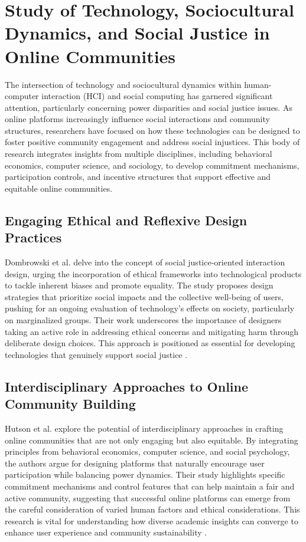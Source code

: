 \section{Study of Technology, Sociocultural Dynamics, and Social Justice in Online Communities}
The intersection of technology and sociocultural dynamics within human-computer interaction (HCI) and social computing has garnered significant attention, particularly concerning power disparities and social justice issues. As online platforms increasingly influence social interactions and community structures, researchers have focused on how these technologies can be designed to foster positive community engagement and address social injustices. This body of research integrates insights from multiple disciplines, including behavioral economics, computer science, and sociology, to develop commitment mechanisms, participation controls, and incentive structures that support effective and equitable online communities.

\subsection{Engaging Ethical and Reflexive Design Practices}
Dombrowski et al. delve into the concept of social justice-oriented interaction design, urging the incorporation of ethical frameworks into technological products to tackle inherent biases and promote equality. The study proposes design strategies that prioritize social impacts and the collective well-being of users, pushing for an ongoing evaluation of technology's effects on society, particularly on marginalized groups. Their work underscores the importance of designers taking an active role in addressing ethical concerns and mitigating harm through deliberate design choices. This approach is positioned as essential for developing technologies that genuinely support social justice \cite{Dombrowski_Harmon_Fox_2016}.

\subsection{Interdisciplinary Approaches to Online Community Building}
Hutson et al. explore the potential of interdisciplinary approaches in crafting online communities that are not only engaging but also equitable. By integrating principles from behavioral economics, computer science, and social psychology, the authors argue for designing platforms that naturally encourage user participation while balancing power dynamics. Their study highlights specific commitment mechanisms and control features that can help maintain a fair and active community, suggesting that successful online platforms can emerge from the careful consideration of varied human factors and ethical considerations. This research is vital for understanding how diverse academic insights can converge to enhance user experience and community sustainability \cite{Hutson_Taft_Barocas_Levy_2018}.

